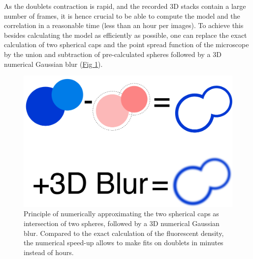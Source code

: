 \documentclass[A4paperpaper,11pt,english]{sphinxmanual}
\begin{document}
As the doublets contraction is rapid, and the recorded 3D stacks contain a
large number of frames, it is hence crucial to be able to compute the model and the
correlation in a reasonable time (less than an hour per images). To
achieve this besides calculating the model as efficiently as possible, one can
replace the exact calculation of two spherical caps and the point spread
function of the microscope by the union and subtraction of pre-calculated spheres followed by a 3D
numerical Gaussian blur (\hyperref[parts/part4:fig-mdl]{Fig  \ref*{parts/part4:fig-mdl}}).
\begin{figure}[htbp]
\centering
\capstart

\includegraphics[width=0.600\linewidth]{3dblur.png}
\caption{Principle of numerically approximating the two spherical caps as intersection of two spheres,
followed by a 3D numerical Gaussian blur. Compared to the exact calculation of the fluorescent density, the numerical speed-up allows
to make fits on doublets in minutes instead of hours.}\label{parts/part4:fig-mdl}\end{figure}
\end{document}
